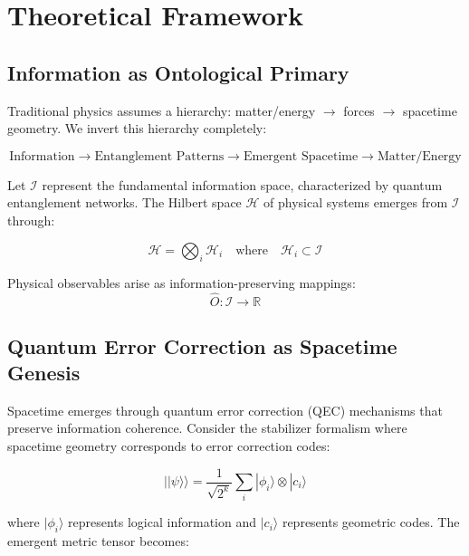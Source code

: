 \documentclass[12pt]{article}
\begin{document}
\section{Theoretical Framework}

\subsection{Information as Ontological Primary}

Traditional physics assumes a hierarchy: matter/energy $\rightarrow$ forces $\rightarrow$ spacetime geometry. We invert this hierarchy completely:

\begin{equation}
\text{Information} \rightarrow \text{Entanglement Patterns} \rightarrow \text{Emergent Spacetime} \rightarrow \text{Matter/Energy}
\end{equation}

Let $\mathcal{I}$ represent the fundamental information space, characterized by quantum entanglement networks. The Hilbert space $\mathcal{H}$ of physical systems emerges from $\mathcal{I}$ through:

\begin{equation}
\mathcal{H} = \bigotimes_{i} \mathcal{H}_i \quad \text{where} \quad \mathcal{H}_i \subset \mathcal{I}
\end{equation}

Physical observables arise as information-preserving mappings:
\begin{equation}
\hat{O}: \mathcal{I} \rightarrow \mathbb{R}
\end{equation}

\subsection{Quantum Error Correction as Spacetime Genesis}

Spacetime emerges through quantum error correction (QEC) mechanisms that preserve information coherence. Consider the stabilizer formalism where spacetime geometry corresponds to error correction codes:

\begin{equation}
||\psi\rangle\rangle = \frac{1}{\sqrt{2^k}} \sum_{i} |\phi_i\rangle \otimes |c_i\rangle
\end{equation}

where $|\phi_i\rangle$ represents logical information and $|c_i\rangle$ represents geometric codes. The emergent metric tensor becomes:
\end{document}
